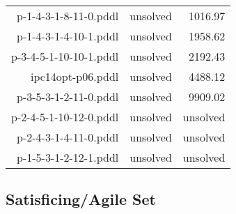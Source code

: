 \documentclass{article}
\begin{document}
\begin{center}
\begin{tabular}{r|r|r}
 p-1-4-3-1-8-11-0.pddl&unsolved&1016.97\\
 p-1-4-3-1-4-10-1.pddl&unsolved&1958.62\\
 p-3-4-5-1-10-10-1.pddl&unsolved&2192.43\\
 ipc14opt-p06.pddl&unsolved&4488.12\\
 p-3-5-3-1-2-11-0.pddl&unsolved&9909.02\\
 p-2-4-5-1-10-12-0.pddl&unsolved&unsolved\\
 p-2-4-3-1-4-11-0.pddl&unsolved&unsolved\\
 p-1-5-3-1-2-12-1.pddl&unsolved&unsolved
                            \end{tabular}
                            \end{center}
                    
                    
                    \subsection*{Satisficing/Agile Set}
                    
\end{document}
